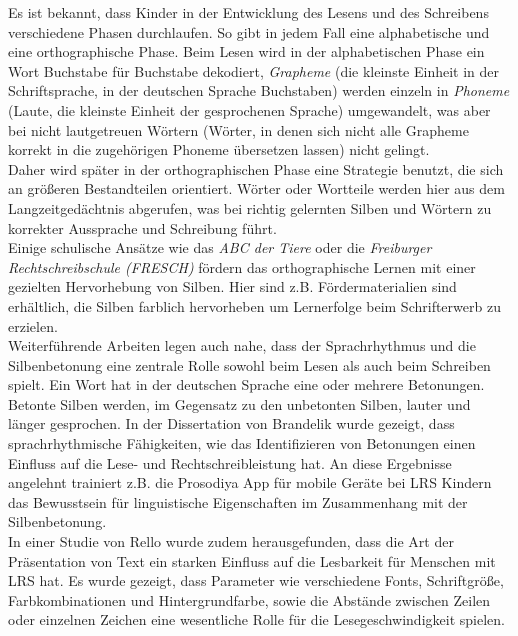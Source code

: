 Es ist bekannt, dass Kinder in der Entwicklung des Lesens und des Schreibens verschiedene Phasen durchlaufen\cite{Steinbrink2014}. So gibt in jedem Fall eine alphabetische und eine orthographische Phase. Beim Lesen wird in der alphabetischen Phase ein Wort Buchstabe für Buchstabe dekodiert, \textit{Grapheme} (die kleinste Einheit in der Schriftsprache, in der deutschen Sprache Buchstaben) werden einzeln in \textit{Phoneme} (Laute, die kleinste Einheit der gesprochenen Sprache) umgewandelt, was aber bei nicht lautgetreuen Wörtern (Wörter, in denen sich nicht alle Grapheme korrekt in die zugehörigen Phoneme übersetzen lassen) nicht gelingt.\\
Daher wird später in der orthographischen Phase eine Strategie benutzt, die sich an größeren Bestandteilen orientiert. Wörter oder Wortteile werden hier aus dem Langzeitgedächtnis abgerufen, was bei richtig gelernten Silben und Wörtern zu korrekter Aussprache und Schreibung führt.\\
Einige schulische Ansätze wie das \textit{ABC der Tiere}\cite{mildenberger2013} oder die \textit{Freiburger Rechtschreibschule (FRESCH)}\cite{Fresch2016} fördern das orthographische Lernen mit einer gezielten Hervorhebung von Silben. Hier sind z.B. Fördermaterialien sind erhältlich, die Silben farblich hervorheben um Lernerfolge beim Schrifterwerb zu erzielen.\\

Weiterführende Arbeiten legen auch nahe, dass der Sprachrhythmus und die Silbenbetonung eine zentrale Rolle sowohl beim Lesen als auch beim Schreiben spielt. Ein Wort hat in der deutschen Sprache eine oder mehrere Betonungen. Betonte Silben werden, im Gegensatz zu den unbetonten Silben, lauter und länger gesprochen. In der Dissertation von Brandelik\cite{Brandelik2014} wurde gezeigt, dass sprachrhythmische Fähigkeiten, wie das Identifizieren von Betonungen einen Einfluss auf die Lese- und Rechtschreibleistung hat. An diese Ergebnisse angelehnt trainiert z.B. die Prosodiya App\cite{Holz2017} für mobile Geräte bei LRS Kindern das Bewusstsein für linguistische Eigenschaften im Zusammenhang mit der Silbenbetonung.\\
In einer Studie von Rello\cite{Rello:2017:PMR:3057333.3057414} wurde zudem herausgefunden, dass die Art der Präsentation von Text ein starken Einfluss auf die Lesbarkeit für Menschen mit LRS hat. Es wurde gezeigt, dass Parameter wie verschiedene Fonts, Schriftgröße, Farbkombinationen und Hintergrundfarbe, sowie die Abstände zwischen Zeilen oder einzelnen Zeichen eine wesentliche Rolle für die Lesegeschwindigkeit spielen.

